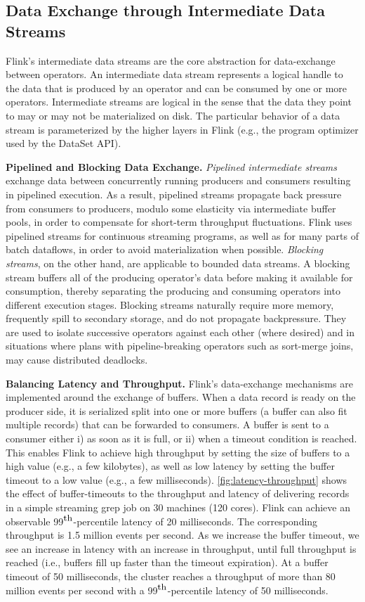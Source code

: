 \documentclass[11pt]{article}
\newcommand{\para}[1]{\vspace{2mm}\noindent\textbf{#1}}
\begin{document}
\subsection{Data Exchange through Intermediate Data Streams}
Flink's intermediate data streams are the core abstraction for data-exchange between operators. An intermediate data stream represents a logical handle to the data that is produced by an operator and can be consumed by one or more operators. Intermediate streams are logical in the sense that the data they point to may or may not be materialized on disk. The particular behavior of a data stream is parameterized by the higher layers in Flink (e.g., the program optimizer used by the DataSet API). 


\para{Pipelined and Blocking Data Exchange.} \emph{Pipelined intermediate streams} exchange data between concurrently running producers and consumers resulting in pipelined execution. As a result, pipelined streams propagate back pressure from consumers to producers, modulo some elasticity via intermediate buffer pools, in order to compensate for short-term throughput fluctuations. Flink uses pipelined streams for continuous streaming programs, as well as for many parts of batch dataflows, in order to avoid materialization when possible. \emph{Blocking streams}, on the other hand, are applicable to bounded data streams. A blocking stream buffers all of the producing operator's data before making it available for consumption, thereby separating the producing and consuming operators into different execution stages. Blocking streams naturally require more memory, frequently spill to secondary storage, and do not propagate backpressure. They are used to isolate successive operators against each other (where desired) and in situations where plans with pipeline-breaking operators such as sort-merge joins, may cause distributed deadlocks.

\para{Balancing Latency and Throughput.} Flink's data-exchange mechanisms are implemented around the exchange of buffers. When a data record is ready on the producer side, it is serialized split into one or more buffers (a buffer can also fit multiple records) that can be forwarded to consumers. A buffer is sent to a consumer either i) as soon as it is full, or ii) when a timeout condition is reached. This enables Flink to achieve high throughput by setting the size of buffers to a high value (e.g., a few kilobytes), as well as low latency by setting the buffer timeout to a low value (e.g., a few milliseconds). \autoref{fig:latency-throughput} shows the effect of buffer-timeouts to the throughput and latency of delivering records in a simple streaming grep job on 30 machines (120 cores). Flink can achieve an observable 99$^{\mbox{\small{th}}}$-percentile latency of 20 milliseconds. The corresponding throughput is 1.5 million events per second. As we increase the buffer timeout, we see an increase in latency with an increase in throughput, until full throughput is reached (i.e., buffers fill up faster than the timeout expiration). At a buffer timeout of 50 milliseconds, the cluster reaches a throughput of more than 80 million events per second with a 99$^{\mbox{\small{th}}}$-percentile latency of 50 milliseconds.
\end{document}
